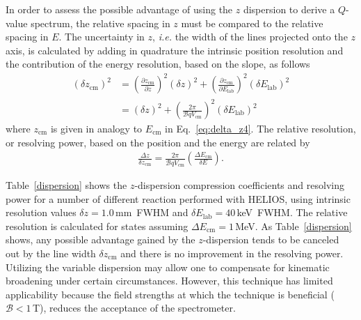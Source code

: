 In order to assess the possible advantage of using the $z$ dispersion to derive a $Q$-value spectrum, the relative spacing in $z$ must be compared to the relative spacing in $E$.  %
The uncertainty in $z$, \textit{i.e.} the width of the lines projected onto the $z$ axis, is calculated by adding in quadrature the intrinsic position resolution and the contribution of the energy resolution, based on the slope,  as follows  
\begin{equation}
\begin{split}
\left(\delta z_\mathrm{cm}\right)^2&=\left(\frac{\partial z_\mathrm{cm}}{\partial z}\right)^2\left(\delta z\right)^2+\left(\frac{\partial z_\mathrm{cm}}{\partial E_\mathrm{lab}}\right)^2\left(\delta E_\mathrm{lab}\right)^2\\
&=\left(\delta z\right)^2+\left(\frac{2 \pi}{\mathscr{B}q V_\mathrm{cm}}\right)^2\left(\delta E_\mathrm{lab}\right)^2
\end{split}
\label{eq:z_thick}
\end{equation}
where $z_\mathrm{cm}$ is given in analogy to $E_\mathrm{cm}$ in Eq.~\ref{eq:delta_z4}.  The relative resolution, or resolving power, based on the position and the energy are related by
\begin{equation}
\begin{split}
\frac{\Delta z}{\delta z_\mathrm{cm}} =\frac{2 \pi}{\mathscr{B}q V_\mathrm{cm}}\left(\frac{\Delta E_\mathrm{cm}}{\delta E}\right).
\end{split}
\label{eq:delta_z2}
\end{equation}  	%

Table~\ref{dispersion} shows the $z$-dispersion compression coefficients and resolving power for a number of different reaction performed with HELIOS, using intrinsic resolution values $\delta z=1.0$\,mm~FWHM  and $\delta E_\mathrm{lab}=40$\,keV~FWHM.   The relative resolution is calculated for states assuming $\Delta E_\mathrm{cm}=1$\,MeV.  As Table~\ref{dispersion} shows, any possible advantage gained by the $z$-dispersion tends to be canceled out by the line width $\delta z_\mathrm{cm}$ and there is no improvement in the resolving power.  Utilizing the variable dispersion may allow one to compensate for kinematic broadening under certain circumstances.  However, this technique has limited applicability because the field strengths at which the technique is beneficial ($\mathscr{B}<1$\,T), reduces the acceptance of the spectrometer. 


